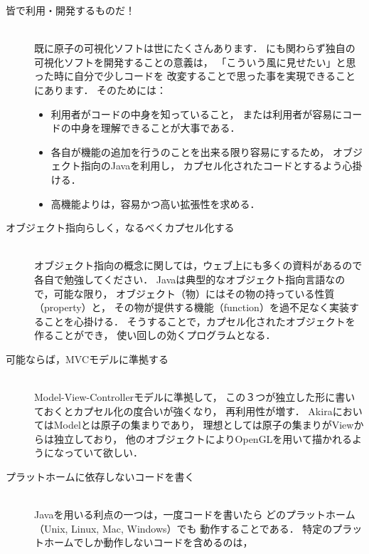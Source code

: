 \documentclass[a4j,openany]{jbook}
\begin{document}
  \begin{description}
   \item[皆で利用・開発するものだ！] \mbox{} \\
              既に原子の可視化ソフトは世にたくさんあります．
              にも関わらず独自の可視化ソフトを開発することの意義は，
              「こういう風に見せたい」と思った時に自分で少しコードを
              改変することで思った事を実現できることにあります．
              そのためには：
              \begin{itemize}
               \item 利用者がコードの中身を知っていること，
                     または利用者が容易にコードの中身を理解できることが大事である．
               \item 各自が機能の追加を行うのことを出来る限り容易にするため，
                     オブジェクト指向のJavaを利用し，
                     カプセル化されたコードとするよう心掛ける．
               \item 高機能よりは，容易かつ高い拡張性を求める．
              \end{itemize}
   \item[オブジェクト指向らしく，なるべくカプセル化する] \mbox{} \\
              オブジェクト指向の概念に関しては，ウェブ上にも多くの資料があるので
              各自で勉強してください．
              Javaは典型的なオブジェクト指向言語なので，可能な限り，
              オブジェクト（物）にはその物の持っている性質（property）と，
              その物が提供する機能（function）を過不足なく実装することを心掛ける．
              そうすることで，カプセル化されたオブジェクトを作ることができ，
              使い回しの効くプログラムとなる．
   \item[可能ならば，MVCモデルに準拠する] \mbox{} \\
              Model-View-Controllerモデルに準拠して，
              この３つが独立した形に書いておくとカプセル化の度合いが強くなり，
              再利用性が増す．
              AkiraにおいてはModelとは原子の集まりであり，
              理想としては原子の集まりがViewからは独立しており，
              他のオブジェクトによりOpenGLを用いて描かれるようになっていて欲しい．
   \item[プラットホームに依存しないコードを書く] \mbox{} \\
              Javaを用いる利点の一つは，一度コードを書いたら
              どのプラットホーム（Unix, Linux, Mac, Windows）でも
              動作することである．
              特定のプラットホームでしか動作しないコードを含めるのは，

\end{description}
\end{document}
